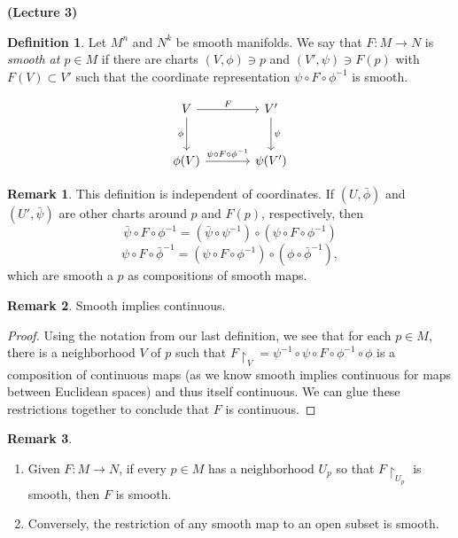 \documentclass[10pt,letterpaper,cm]{nupset}
\theoremstyle{definition}
\newtheorem*{definition}{Definition}
\newtheorem{remark}{Remark}
\newcommand{\1}{\mathbf{1}}
\newcommand{\0}{\vec 0}
\begin{document}
\begin{center}
{\textbf{(Lecture 3)}} 
\end{center}

\begin{definition}
Let $M^n$ and $N^k$ be smooth manifolds. We say that $F: M \to N$ is \textit{smooth at $p \in M$} if there are charts $(V, \phi) \ni p$ and $(V', \psi) \ni F(p)$ with $F(V) \subset V'$ such that the coordinate representation $\psi \circ F \circ \phi^{-1}$ is smooth.
\end{definition}
\[
\begin{tikzcd}[row sep=large, column sep = large]
V \arrow[r, "F"] \arrow[d, "\phi", swap]
& V' \arrow[d, "\psi"] \\
\phi(V) \arrow[r, "\psi \circ F \circ \phi^{-1}"]
& \psi(V')
\end{tikzcd}
\]

\begin{remark}
This definition is independent of coordinates. If $(U, \bar{\phi})$ and $(U', \bar{\psi})$ are other charts around $p$ and $F(p)$, respectively, then $$\bar{\psi} \circ F \circ \phi^{-1} = (\bar{\psi} \circ \psi^{-1}) \circ (\psi \circ F \circ \phi^{-1})$$ $$\psi \circ F\circ \bar{\phi}^{-1} = (\psi \circ F \circ \phi^{-1}) \circ (\phi \circ \bar{\phi}^{-1}),$$ which are smooth a $p$ as compositions of smooth maps.
\end{remark}

\begin{remark}
Smooth implies continuous.
\end{remark}
\begin{proof}
Using the notation from our last definition, we see that for each $p\in M$, there is a neighborhood $V$ of $p$ such that $F\restriction_V =  \psi^{-1} \circ \psi \circ F \circ \phi^{-1} \circ \phi$ is a composition of continuous maps (as we know smooth implies continuous for maps between Euclidean spaces) and thus itself continuous. We can glue these restrictions together to conclude that $F$ is continuous. 
\end{proof}


\begin{remark} $ $
\begin{enumerate}
\item Given $F:M\to N$, if every $p\in M$ has a neighborhood $U_p$ so that $F\restriction_{U_p}$ is smooth, then $F$ is smooth.
\item Conversely, the restriction of any smooth map to an open subset is smooth. 
\end{enumerate}
\end{remark}
\end{document}
